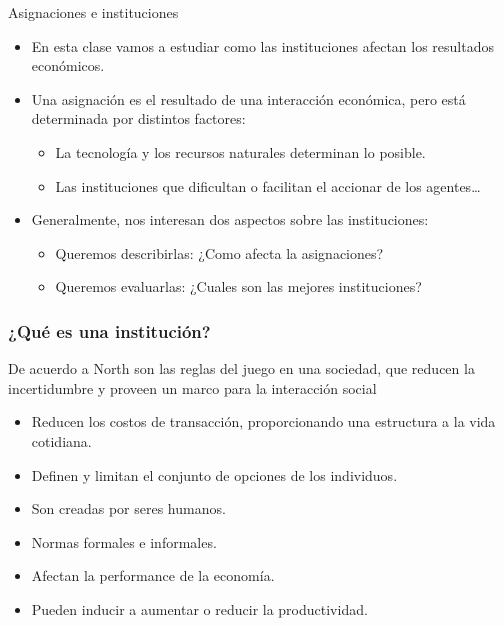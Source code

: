 \documentclass{beamer}
\begin{document}
\begin{frame}{Asignaciones e instituciones}
    \begin{itemize}
        \item En esta clase vamos a estudiar como las instituciones afectan los resultados económicos.
        \item Una asignación es el resultado de una interacción económica, pero está determinada por distintos factores:
        \begin{itemize}
            \item La tecnología y los recursos naturales determinan lo posible.
            \item Las instituciones que dificultan o facilitan el accionar de los agentes\dots
        \end{itemize}
        \item Generalmente, nos interesan dos aspectos sobre las instituciones:
        \begin{itemize}
            \item Queremos describirlas: ¿Como afecta la asignaciones?
            \item Queremos evaluarlas: ¿Cuales son las mejores instituciones?
        \end{itemize}
    \end{itemize} 
\end{frame}

\begin{frame}
\frametitle{¿Qué es una institución?}
    \begin{boxB}
        De acuerdo a North son las reglas del juego en una sociedad, que reducen la incertidumbre y proveen un marco para la interacción social
    \end{boxB}
    \begin{itemize}
        \item Reducen los costos de transacción, proporcionando una estructura a la vida cotidiana.
        \item Definen y limitan el conjunto de opciones de los individuos.
        \item Son creadas por seres humanos.
        \item Normas formales e informales.
        \item Afectan la performance de la economía.
        \item Pueden inducir a aumentar o reducir la productividad.
    \end{itemize}
\end{frame} 
\end{document}
